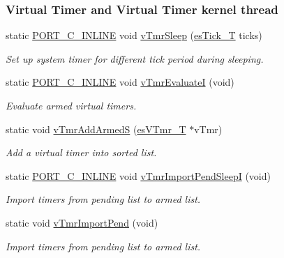 \subsubsection*{Virtual Timer and Virtual Timer kernel thread}
\begin{DoxyCompactItemize}
\item 
static \hyperlink{group__template__compiler_ga87952d6e574c7f437503926e833ba345}{P\-O\-R\-T\-\_\-\-C\-\_\-\-I\-N\-L\-I\-N\-E} void \hyperlink{group__kern__impl_ga6ebc5795dbcc15e76f768133ba99ab17}{v\-Tmr\-Sleep} (\hyperlink{group__kern__intf_ga844873888c186ee81eb66620dadb0451}{es\-Tick\-\_\-\-T} ticks)
\begin{DoxyCompactList}\small\item\em Set up system timer for different tick period during sleeping. \end{DoxyCompactList}\item 
static \hyperlink{group__template__compiler_ga87952d6e574c7f437503926e833ba345}{P\-O\-R\-T\-\_\-\-C\-\_\-\-I\-N\-L\-I\-N\-E} void \hyperlink{group__kern__impl_gab4f2cc4d4d36c36efb272306595a4474}{v\-Tmr\-Evaluate\-I} (void)
\begin{DoxyCompactList}\small\item\em Evaluate armed virtual timers. \end{DoxyCompactList}\item 
static void \hyperlink{group__kern__impl_ga653b749536e91933ea9b651dbb8d5962}{v\-Tmr\-Add\-Armed\-S} (\hyperlink{group__kern__intf_ga3c020f0ca54ff412bc1d1505502d2afc}{es\-V\-Tmr\-\_\-\-T} $\ast$v\-Tmr)
\begin{DoxyCompactList}\small\item\em Add a virtual timer into sorted list. \end{DoxyCompactList}\item 
static \hyperlink{group__template__compiler_ga87952d6e574c7f437503926e833ba345}{P\-O\-R\-T\-\_\-\-C\-\_\-\-I\-N\-L\-I\-N\-E} void \hyperlink{group__kern__impl_ga0ac5061b01fd5124dc99cba3a10b6025}{v\-Tmr\-Import\-Pend\-Sleep\-I} (void)
\begin{DoxyCompactList}\small\item\em Import timers from pending list to armed list. \end{DoxyCompactList}\item 
static void \hyperlink{group__kern__impl_ga9ae79f667b0f7420b31e8a609c3150a0}{v\-Tmr\-Import\-Pend} (void)
\begin{DoxyCompactList}\small\item\em Import timers from pending list to armed list. \end{DoxyCompactList}\item 

\end{DoxyCompactItemize}
